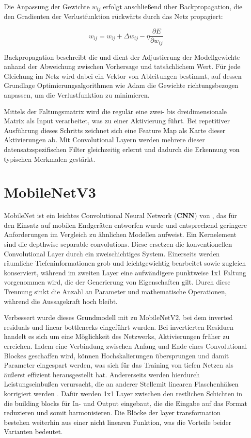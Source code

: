 Die Anpassung der Gewichte $w_{ij}$ erfolgt anschließend über Backpropagation, die den Gradienten der Verlustfunktion rückwärts durch das Netz propagiert:

\begin{equation}
     w_{ij}=w_{ij}+\Delta w_{ij}-\eta \frac{ \partial E}{\partial w_{ij}}
\end{equation}

Backpropagation beschreibt die  und dient der Adjustierung der Modellgewichte anhand der Abweichung zwischen Vorhersage und tatsächlichem Wert. Für jede Gleichung im Netz wird dabei ein Vektor von Ableitungen bestimmt, auf dessen Grundlage Optimierungsalgorithmen wie Adam \cite{Kingma_2015} die Gewichte richtungsbezogen anpassen, um die Verlustfunktion zu minimieren.

Mittels der Faltungsmatrix wird die regulär eine zwei- bis dreidimensionale Matrix als Input verarbeitet, was zu einer Aktivierung führt. Bei repetitiver Ausführung dieses Schritts zeichnet sich eine Feature Map als Karte dieser Aktivierungen ab. Mit Convolutional Layern werden mehrere dieser datensatzspezifischen Filter gleichzeitig erlernt und dadurch die Erkennung von typischen Merkmalen gestärkt.

\section{MobileNetV3}

MobileNet ist ein leichtes Convolutional Neural Network (\textbf{CNN}) von \textcite{Howard_2017}, das für den Einsatz auf mobilen Endgeräten entworfen wurde und entsprechend geringere Anforderungen im Vergleich zu ähnlichen Modellen aufweist. Ein Kernelement sind die depthwise separable convolutions. Diese ersetzen die konventionellen Convolutional Layer durch ein zweischichtiges System. Einerseits werden räumliche Tiefeninformationen grob und leichtgewichtig bearbeitet sowie zugleich konserviert, während im zweiten Layer eine aufwändigere punktweise 1x1 Faltung vorgenommen wird, die der Generierung von Eigenschaften gilt. Durch diese Trennung sinkt die Anzahl an Parameter und mathematische Operationen, während die Aussagekraft hoch bleibt.

Verbessert wurde dieses Grundmodell mit \textcite{Sandler_2018} zu MobileNetV2, bei dem inverted residuals und linear bottlenecks eingeführt wurden. Bei invertierten Residuen handelt es sich um eine Möglichkeit des Netzwerks, Aktivierungen früher zu erreichen. Indem eine Verbindung zwischen Anfang und Ende eines Convolutional Blockes geschaffen wird, können Hochskalierungen übersprungen und damit Parameter eingespart werden, was sich für das Training von tiefen Netzen als äußerst effizient herausgestellt hat.
Andererseits werden hierdurch Leistungseinbußen verursacht, die an anderer Stellemit linearen Flaschenhälsen korrigiert werden . Dafür werden 1x1 Layer zwischen den restlichen Schichten in die building blocks für In- und Output eingebaut, die die Eingabe auf das Format reduzieren und somit harmonisieren. Die Blöcke der layer transformation bestehen weiterhin aus einer nicht linearen Funktion, was die Vorteile beider Varianten bedeutet.

